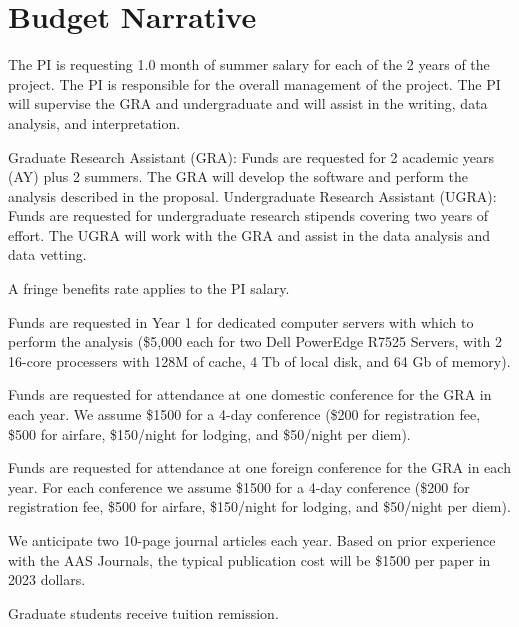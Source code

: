 \documentclass[12pt, preprint]{hacked-aastex}
\begin{document}
\printbibliography[title=~]

\clearpage
\section{Budget Narrative}\label{sec:budget}

 The PI is requesting 1.0 month of
summer salary for each of the 2 years of the project.  The PI is
responsible for the overall management of the project. The PI will
supervise the GRA and undergraduate and will assist in the writing,
data analysis, and interpretation.

Graduate Research Assistant (GRA): Funds are requested for 2 academic years
(AY) plus 2 summers. The GRA will develop the software and perform the
analysis described in the proposal. Undergraduate Research Assistant (UGRA): 
Funds  are requested for undergraduate research stipends covering two years of
effort. The UGRA will work with the GRA and assist in the data analysis 
and data vetting.

 A fringe benefits rate 
applies to the PI salary. %

 Funds are requested in Year 1 for 
dedicated computer  servers with which to perform the analysis (\$5,000 each
for two Dell PowerEdge R7525 Servers, with 2 16-core processers with 128M 
of cache, 4 Tb of local disk,  and 64 Gb of memory).

 Funds are requested for attendance at
one domestic conference for the GRA in each year. We assume \$1500 for
a 4-day conference (\$200 for registration fee, \$500 for airfare,
\$150/night for lodging, and \$50/night per diem).

 Funds are requested for attendance at
one foreign conference for the GRA in each year. For each conference
we assume \$1500 for a 4-day conference (\$200 for registration fee,
\$500 for airfare, \$150/night for lodging, and \$50/night per diem).

 We anticipate two 10-page journal
articles each year. Based on prior experience with the AAS Journals,
the typical publication cost will be \$1500 per paper in 2023 dollars.

Graduate students receive tuition remission. %
\end{document}

